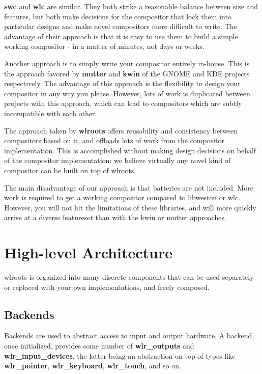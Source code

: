 \documentclass{article}
\begin{document}
\textbf{swc} and \textbf{wlc} are similar. They both strike a reasonable balance
between size and features, but both make decisions for the compositor that lock
them into particular designs and make novel compositors more difficult to
write. The advantage of their approach is that it is easy to use them to build a
simple working compositor - in a matter of minutes, not days or weeks.

Another approach is to simply write your compositor entirely in-house. This is
the approach favored by \textbf{mutter} and \textbf{kwin} of the GNOME and KDE
projects respectively. The advantage of this approach is the flexibility to
design your compositor in any way you please. However, lots of work is
duplicated between projects with this approach, which can lead to compositors
which are subtly incompatible with each other.

The approach taken by \textbf{wlroots} offers reusability and consistency
between compositors based on it, and offloads lots of work from the compositor
implementation. This is accomplished without making design decisions on behalf
of the compositor implementation: we believe virtually any novel kind of
compositor can be built on top of wlroots.

The main disadvantage of our approach is that batteries are not included. More
work is required to get a working compositor compared to libweston or wlc.
However, you will not hit the limitations of these libraries, and will more
quickly arrive at a diverse featureset than with the kwin or mutter approaches.

\section{High-level Architecture}\label{highlevel}

wlroots is organized into many discrete components that can be used separately
or replaced with your own implementations, and freely composed.

\subsection{Backends}\label{high level backends}

Backends are used to abstract access to input and output hardware. A backend,
once initialized, provides some number of \textbf{wlr_outputs} and
\textbf{wlr_input_devices}, the latter being an abstraction on top of types
like \textbf{wlr_pointer}, \textbf{wlr_keyboard}, \textbf{wlr_touch}, and so on.
\end{document}
